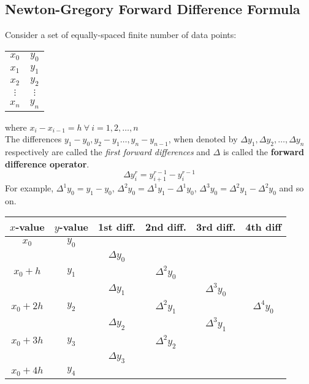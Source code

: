 \documentclass[12pt,a4paper,landscape]{article}
\begin{document}
	\subsection{Newton-Gregory Forward Difference Formula}
		Consider a set of equally-spaced finite number of data points:
		\begin{center}
			\begin{tabular}{|c|c|}
				\hline
				$x_0$& $y_0$\\
				$x_1$&	$y_1$\\
				$x_2$&	$y_2$\\
				$\vdots$&	$\vdots$\\
				$x_n$&	$y_n$\\
				\hline
			\end{tabular}
		\end{center}
		where $x_i - x_{i-1} = h\ \forall\ i = 1,2,\ldots,n$		\\
		The differences $y_1 - y_0,y_2 - y_1 \ldots, y_n - y_{n-1} $, when denoted by $\Delta y_1, \Delta y_2, \ldots, \Delta y_n$ respectively are called the \textit{first forward differences} and $\Delta$ is called the \textbf{forward difference operator}.
		\begin{equation}\label{for-op}
			\Delta y^r_i = y^{r-1}_{i+1} - y^{r-1}_{i}
		\end{equation}
		For example, $\Delta^1 y_0 = y_1 - y_0$, $\Delta^2 y_0 = \Delta^1 y_1 - \Delta^1 y_0$, $\Delta^3 y_0 = \Delta^2 y_1 - \Delta^2 y_0$  and so on.\\
		\begin{center}
			\begin{tabular}{cccccc}
				\hline
				$x$-value& $y$-value& 1st diff.& 2nd diff.& 3rd diff.& 4th diff\\ \hline
				$x_0$&	$y_0$&	&&&\\
				&& $\Delta y_0$&&&\\
				$x_0 + h$&	$y_1$	& & $\Delta^2 y_0$&&\\
				&& $\Delta y_1$& & $\Delta^3 y_0$&\\
				$x_0 + 2h$&	$y_2$	& & $\Delta^2 y_1$&& $\Delta^4 y_0$\\ 
				&& $\Delta y_2$& & $\Delta^3 y_1$&\\
				$x_0 + 3h$&	$y_3$	& & $\Delta^2 y_2$&&\\
				&& $\Delta y_3$&&&\\
				$x_0 + 4h$&	$y_4$	& & &&\\ \hline
			\end{tabular}\\
		\end{center}
\end{document}
